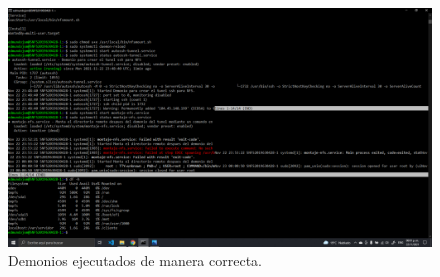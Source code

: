 \documentclass[11pt]{article}
\begin{document}
		 \begin{figure}[H]
			\centering
			\includegraphics[scale=0.34]{resources/demoniosonc1.png}
			\caption{Demonios ejecutados de manera correcta.}\label{fig:picture}
		\end{figure}
\end{document}
